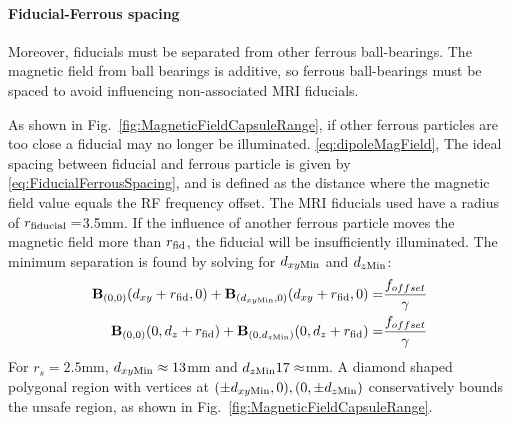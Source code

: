 \documentclass[letterpaper, 10 pt]{IEEEtran}
\begin{document}
\paragraph{Fiducial-Ferrous spacing}
Moreover, fiducials must be separated from other ferrous ball-bearings.  The magnetic field from ball bearings is additive, so ferrous ball-bearings  must be spaced to avoid influencing non-associated MRI fiducials.

As shown in Fig.~\ref{fig:MagneticFieldCapsuleRange}, if other ferrous particles are too close a fiducial may no longer be illuminated.  
\eqref{eq:dipoleMagField}, 
The ideal spacing between fiducial and ferrous particle is given by \ref{eq:FiducialFerrousSpacing}, and is defined as the distance where the magnetic field value equals the RF frequency offset.  The MRI fiducials used have a radius of $r_{\rm{fiducial}}=$3.5mm.  If the influence of another ferrous particle moves the magnetic field more than $r_{\rm{fid}}$, the fiducial will be insufficiently illuminated.
 The minimum separation is found by solving for $d_{xy\rm{Min}}$ and $d_{z\rm{Min}}$:
\begin{align}\label{eq:FiducialFerrousFerrousSpacing}
 \mathbf{B}_{(0,0)}(d_{xy}+r_{\rm{fid}},0) +  \mathbf{B}_{(d_{xy\rm{Min}},0)}(d_{xy}+r_{\rm{fid}},0) =& \frac{f_{offset}}{\gamma}\nonumber \\
  \mathbf{B}_{(0,0)}(0,d_z+r_{\rm{fid}}) +  \mathbf{B}_{(0,d_{z\rm{Min}})}(0,d_z+r_{\rm{fid}}) =& \frac{f_{offset}}{\gamma} 
\end{align}
For $r_s=2.5$mm, $d_{xy\rm{Min}}\approx13$mm and $d_{z\rm{Min}}17\approx$mm.  A diamond shaped polygonal region with vertices at  $(\pm d_{xy\rm{Min}},0),(0,\pm d_{z\rm{Min}})$ conservatively bounds the unsafe region, as shown in Fig.~\ref{fig:MagneticFieldCapsuleRange}.
\end{document}
